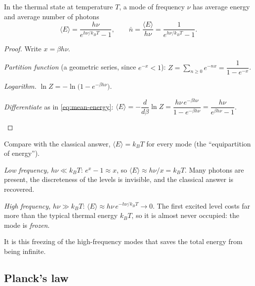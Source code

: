 \begin{proposition}\label{prop:planck-mode}
  In the thermal state at temperature $T$, a mode of frequency $\nu$ has average energy and average number of photons
  \[
    \langle E\rangle=\frac{h\nu}{e^{h\nu/k_BT}-1},\qquad\bar n=\frac{\langle E\rangle}{h\nu}=\frac1{e^{h\nu/k_BT}-1}.
  \]
\end{proposition}
\begin{proof}
  Write $x=\beta h\nu$.
  \begin{steps}
    \item \emph{Partition function} (a geometric series, since $e^{-x}<1$): $Z=\sum_{n\ge0}e^{-nx}=\dfrac1{1-e^{-x}}$.
    \item \emph{Logarithm.} $\ln Z=-\ln\bigl(1-e^{-\beta h\nu}\bigr)$.
    \item \emph{Differentiate} as in \eqref{eq:mean-energy}: $\langle E\rangle=-\dfrac{d}{d\beta}\ln Z=\dfrac{h\nu\,e^{-\beta h\nu}}{1-e^{-\beta h\nu}}=\dfrac{h\nu}{e^{\beta h\nu}-1}$. \qedhere
  \end{steps}
\end{proof}

Compare with the classical answer, $\langle E\rangle=k_BT$ for every mode (the ``equipartition of energy'').
\begin{steps}
  \item \emph{Low frequency,} $h\nu\ll k_BT$: $e^x-1\approx x$, so $\langle E\rangle\approx h\nu/x=k_BT$. Many photons are present, the discreteness of the levels is invisible, and the classical answer is recovered.
  \item \emph{High frequency,} $h\nu\gg k_BT$: $\langle E\rangle\approx h\nu\,e^{-h\nu/k_BT}\to0$. The first excited level costs far more than the typical thermal energy $k_BT$, so it is almost never occupied: the mode is \emph{frozen}.
\end{steps}
It is this freezing of the high-frequency modes that saves the total energy from being infinite.

\subsection{Planck's law}

